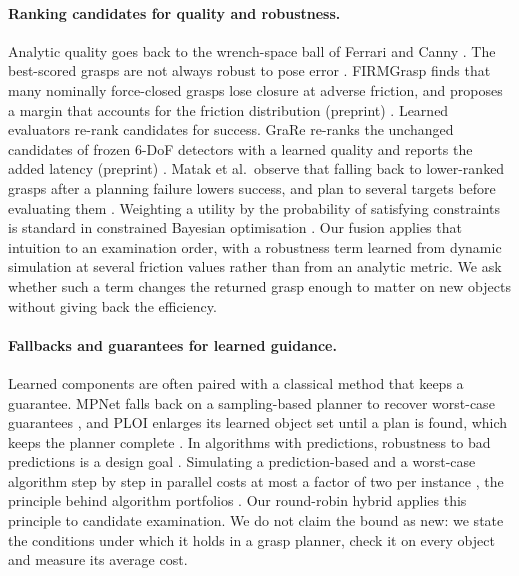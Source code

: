 \documentclass[pdflatex,sn-mathphys-num,iicol]{sn-jnl}
\begin{document}
\paragraph{Ranking candidates for quality and robustness.} Analytic quality goes back to the wrench-space ball of Ferrari and Canny \cite{ferrari1992planning}. The best-scored grasps are not always robust to pose error \cite{weisz2012pose}. FIRMGrasp finds that many nominally force-closed grasps lose closure at adverse friction, and proposes a margin that accounts for the friction distribution (preprint) \cite{enwerem2026firmgrasp}. Learned evaluators re-rank candidates for success. GraRe re-ranks the unchanged candidates of frozen 6-DoF detectors with a learned quality and reports the added latency (preprint) \cite{yuan2026grare}. Matak et al.\ observe that falling back to lower-ranked grasps after a planning failure lowers success, and plan to several targets before evaluating them \cite{matak2026fpte}. Weighting a utility by the probability of satisfying constraints is standard in constrained Bayesian optimisation \cite{gardner2014constraints}. Our fusion applies that intuition to an examination order, with a robustness term learned from dynamic simulation at several friction values rather than from an analytic metric. We ask whether such a term changes the returned grasp enough to matter on new objects without giving back the efficiency.

\paragraph{Fallbacks and guarantees for learned guidance.} Learned components are often paired with a classical method that keeps a guarantee. MPNet falls back on a sampling-based planner to recover worst-case guarantees \cite{qureshi2021mpnet}, and PLOI enlarges its learned object set until a plan is found, which keeps the planner complete \cite{silver2021ploi}. In algorithms with predictions, robustness to bad predictions is a design goal \cite{mitzenmacher2022predictions}. Simulating a prediction-based and a worst-case algorithm step by step in parallel costs at most a factor of two per instance \cite{vandenbrand2024dynamic}, the principle behind algorithm portfolios \cite{gomes2001portfolios}. Our round-robin hybrid applies this principle to candidate examination. We do not claim the bound as new: we state the conditions under which it holds in a grasp planner, check it on every object and measure its average cost.
\end{document}
